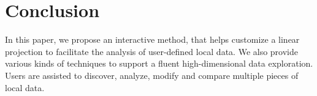 \section{Conclusion}
In this paper, we propose an interactive method, that helps customize a linear projection to facilitate the analysis of user-defined local data. We also provide various kinds of techniques to support a fluent high-dimensional data exploration. Users are assisted to discover, analyze, modify and compare multiple pieces of local data.